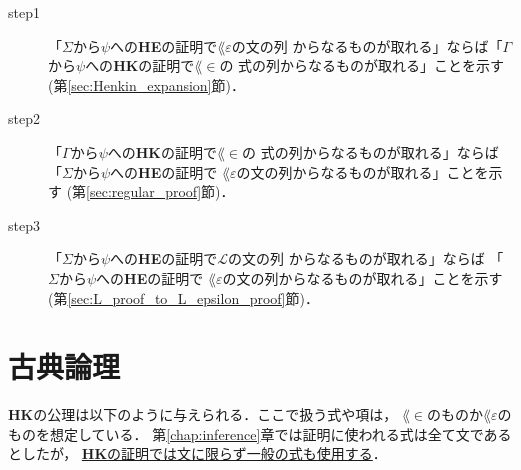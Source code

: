 	\begin{description}
		\item[step1] 「$\Sigma$から$\psi$への{\bf HE}の証明で$\lang{\varepsilon}$の文の列
			からなるものが取れる」ならば「$\Gamma$から$\psi$への{\bf HK}の証明で$\lang{\in}$の
			式の列からなるものが取れる」ことを示す(第\ref{sec:Henkin_expansion}節)．
			
		\item[step2] 「$\Gamma$から$\psi$への{\bf HK}の証明で$\lang{\in}$の
			式の列からなるものが取れる」ならば「$\Sigma$から$\psi$への{\bf HE}の証明で
			$\lang{\varepsilon}$の文の列からなるものが取れる」ことを示す
			(第\ref{sec:regular_proof}節)．
		
		\item[step3]  「$\Sigma$から$\psi$への{\bf HE}の証明で$\mathcal{L}$の文の列
			からなるものが取れる」ならば 「$\Sigma$から$\psi$への{\bf HE}の証明で
			$\lang{\varepsilon}$の文の列からなるものが取れる」ことを示す
			(第\ref{sec:L_proof_to_L_epsilon_proof}節)．
	\end{description}
	
\section{古典論理}
	{\bf HK}の公理は以下のように与えられる．ここで扱う式や項は，
	$\lang{\in}$のものか$\lang{\varepsilon}$のものを想定している．
	第\ref{chap:inference}章では証明に使われる式は全て文であるとしたが，
	\underline{{\bf HK}の証明では文に限らず一般の式も使用する}．
	
